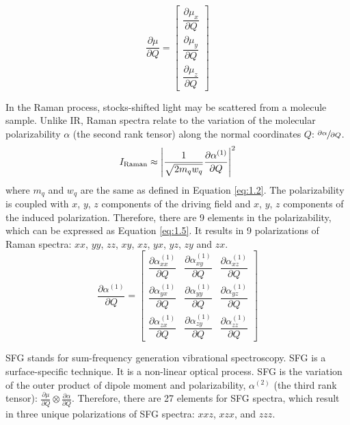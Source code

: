 \begin{equation} \label{eq:1.3}
\frac{\partial\mu}{\partial Q} = \begin{bmatrix}
									\dfrac{\partial\mu_{x}}{\partial Q} \\
									\dfrac{\partial\mu_{y}}{\partial Q} \\
									\dfrac{\partial\mu_{z}}{\partial Q}
								  \end{bmatrix}
\end{equation}

In the Raman process, stocks-shifted light may be scattered from a molecule sample. Unlike IR, Raman spectra relate to the variation of the molecular polarizability $\alpha$ (the second rank tensor) along the normal coordinates $Q$: $\sfrac{\partial\alpha}{\partial Q}$. \\ 

\begin{equation} \label{eq:1.4}
I_{\rm Raman} \approx \left| \frac{1}{\sqrt{2m_{q}w_{q}}} \frac{\partial\alpha^{(1)}}{\partial Q} \right|^{2}
\end{equation}
where $m_{q}$ and $w_{q}$ are the same as defined in Equation \ref{eq:1.2}. The polarizability is coupled with $x$, $y$, $z$ components of the driving field and $x$, $y$, $z$ components of the induced polarization. Therefore, there are 9 elements in the polarizability, which can be expressed as Equation \ref{eq:1.5}. It results in 9 polarizations of Raman spectra: $xx$, $yy$, $zz$, $xy$, $xz$, $yx$, $yz$, $zy$ and $zx$. \\

\begin{equation} \label{eq:1.5}
\frac{\partial\alpha^{(1)}}{\partial Q} = \begin{bmatrix}
\dfrac{\partial\alpha_{xx}^{(1)}}{\partial Q} & \dfrac{\partial\alpha_{xy}^{(1)}}{\partial Q} & \dfrac{\partial\alpha_{xz}^{(1)}}{\partial Q} \\
\dfrac{\partial\alpha_{yx}^{(1)}}{\partial Q} & \dfrac{\partial\alpha_{yy}^{(1)}}{\partial Q} & \dfrac{\partial\alpha_{yz}^{(1)}}{\partial Q}\\
\dfrac{\partial\alpha_{zx}^{(1)}}{\partial Q} & \dfrac{\partial\alpha_{zy}^{(1)}}{\partial Q} & \dfrac{\partial\alpha_{zz}^{(1)}}{\partial Q}
\end{bmatrix}
\end{equation}

SFG stands for sum-frequency generation vibrational spectroscopy. SFG is a surface-specific technique. It is a non-linear optical process. SFG is the variation of the outer product of dipole moment and polarizability, $\alpha^{(2)}$ (the third rank tensor): $\frac{\partial\mu}{\partial Q} \otimes \frac{\partial\alpha}{\partial Q} $. Therefore, there are 27 elements for SFG spectra, which result in three unique polarizations of SFG spectra: $xxz$, $xzx$, and $zzz$. \\

